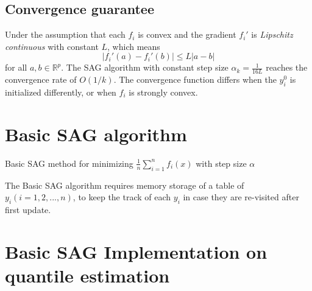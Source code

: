 \subsection{Convergence guarantee}

Under the assumption that each $f_i$ is convex and the gradient $f_i\prime$ is \textit{Lipschitz continuous} with constant $L$, which means
$$
|f_i\prime (a) - f_i\prime (b)| \leq L|a-b|
$$
for all $a,b \in \mathbb{R}^p$.
The SAG algorithm with constant step size $\alpha_k = \frac{1}{16L}$ reaches the convergence rate of $O(1/k)$. The convergence function differs when the $y_i^0$ is initialized differently, or when $f_i$ is strongly convex.


\section{Basic SAG algorithm}

\begin{algorithm}
    \caption{Basic SAG method for minimizing $\frac{1}{n} \sum^n_{i=1}f_i(x)$ with step size $\alpha$}\label{alg:SAG_ori}
        \begin{algorithmic}[1]
                       
            \EndFor
        \end{algorithmic}
\end{algorithm}

The Basic SAG algorithm requires memory storage of a table of $y_i (i= 1, 2, ...,n)$, to keep the track of each $y_i$ in case they are re-visited after first update.

\section{Basic SAG Implementation on quantile estimation}

